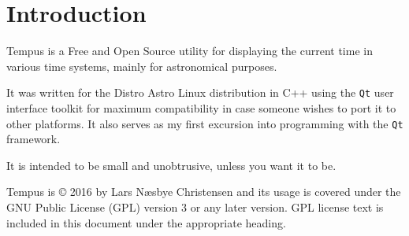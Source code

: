 \section{Introduction}
Tempus is a Free and Open Source utility for displaying the current time in various time systems, mainly for astronomical purposes.

It was written for the Distro Astro Linux distribution in C++ using the \texttt{Qt} user interface toolkit for maximum compatibility in case someone wishes to port it to other platforms.
It also serves as my first excursion into programming with the \texttt{Qt} framework.

It is intended to be small and unobtrusive, unless you want it to be.

Tempus is {\copyright} 2016 by Lars N{\ae}sbye Christensen and its usage is covered under the GNU Public License (GPL) version 3 or any later version. GPL license text is included in this document under the appropriate heading.

